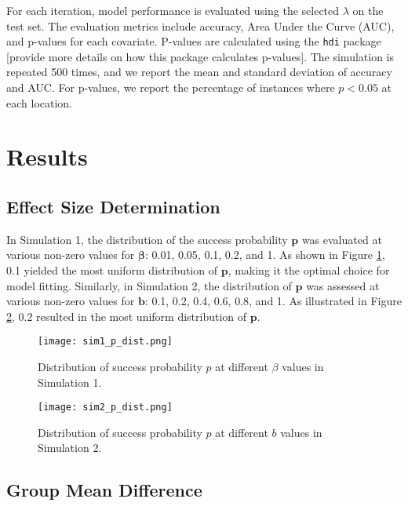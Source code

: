 \documentclass[12pt]{article}
\begin{document}
For each iteration, model performance is evaluated using the selected \( \lambda \) on the test set. The evaluation metrics include accuracy, Area Under the Curve (AUC), and p-values for each covariate. P-values are calculated using the \texttt{hdi} package [provide more details on how this package calculates p-values]. The simulation is repeated 500 times, and we report the mean and standard deviation of accuracy and AUC. For p-values, we report the percentage of instances where \( p < 0.05 \) at each location.


\section*{Results}

\subsection*{Effect Size Determination}

In Simulation 1, the distribution of the success probability \( \mathbf{p} \) was evaluated at various non-zero values for \( \boldsymbol{\beta} \): 0.01,
0.05, 0.1, 0.2, and 1. As shown in Figure \ref{fig:sim1_p_dist}, 0.1 yielded the most uniform distribution
of \( \mathbf{p} \), making it the optimal choice for model fitting. Similarly, in Simulation 2, the distribution of \( \mathbf{p} \) was assessed at various non-zero values for \( \mathbf{b} \): 0.1, 0.2, 0.4, 0.6, 0.8, and 1. As illustrated in Figure \ref{fig:sim2_p_dist}, 0.2 resulted in the most uniform distribution of \( \mathbf{p} \).

\begin{figure}[h!]
	\centering
	\texttt{[image: sim1\_p\_dist.png]}
	\caption{Distribution of success probability \( p \) at different \( \beta \) values in Simulation 1.}
	\label{fig:sim1_p_dist}
\end{figure}

\begin{figure}[h!]
	\centering
	\texttt{[image: sim2\_p\_dist.png]}
	\caption{Distribution of success probability \( p \) at different \( b \) values in Simulation 2.}
	\label{fig:sim2_p_dist}
\end{figure}

\FloatBarrier

\subsection*{Group Mean Difference}
\end{document}
